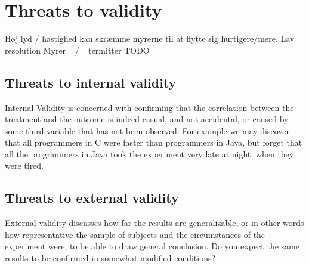 
\section{Threats to validity}

Høj lyd / hastighed kan skræmme myrerne til at flytte sig hurtigere/mere.
Lav resolution
Myrer =/= termitter
TODO

\subsection{Threats to internal validity}
Internal Validity is concerned with confirming that the correlation between the treatment and the outcome is indeed casual, and not accidental, or caused by some third variable that has not been observed. For example we may discover that all programmers in C were faster than programmers in Java, but forget that all the programmers in Java took the experiment very late at night, when they were tired.

\subsection{Threats to external validity}
External validity discusses how far the results are generalizable, or in other words how representative the sample of subjects and the circumstances of the experiment were, to be able to draw general conclusion. Do you expect the same results to be confirmed in somewhat modified conditions?
